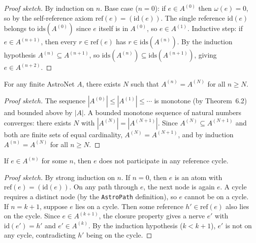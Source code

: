 \begin{proof}[Proof sketch]
By induction on $n$.  Base case ($n = 0$): if $e \in A^{(0)}$ then $\omega(e) = 0$, so by the self-reference axiom $\mathrm{ref}(e) = (\mathrm{id}(e))$.  The single reference $\mathrm{id}(e)$ belongs to $\mathrm{ids}(A^{(0)})$ since $e$ itself is in $A^{(0)}$, so $e \in A^{(1)}$.  Inductive step: if $e \in A^{(n+1)}$, then every $r \in \mathrm{ref}(e)$ has $r \in \mathrm{ids}(A^{(n)})$.  By the induction hypothesis $A^{(n)} \subseteq A^{(n+1)}$, so $\mathrm{ids}(A^{(n)}) \subseteq \mathrm{ids}(A^{(n+1)})$, giving $e \in A^{(n+2)}$.
\end{proof}

\begin{theorem}[Stabilization]\label{prop:stage-stabilize}
For any finite AstroNet $A$, there exists $N$ such that $A^{(n)} = A^{(N)}$ for all $n \geq N$.
\end{theorem}

\begin{proof}[Proof sketch]
The sequence $|A^{(0)}| \leq |A^{(1)}| \leq \cdots$ is monotone (by Theorem~6.2) and bounded above by $|A|$.  A bounded monotone sequence of natural numbers converges: there exists $N$ with $|A^{(N)}| = |A^{(N+1)}|$.  Since $A^{(N)} \subseteq A^{(N+1)}$ and both are finite sets of equal cardinality, $A^{(N)} = A^{(N+1)}$, and by induction $A^{(n)} = A^{(N)}$ for all $n \geq N$.
\end{proof}

\begin{theorem}
If $e \in A^{(n)}$ for some $n$, then $e$ does not participate in any reference cycle.
\end{theorem}

\begin{proof}[Proof sketch]
By strong induction on $n$.  If $n = 0$, then $e$ is an atom with $\mathrm{ref}(e) = (\mathrm{id}(e))$.  On any path through $e$, the next node is again $e$.  A cycle requires a distinct node (by the \texttt{AstroPath} definition), so $e$ cannot be on a cycle.  If $n = k+1$, suppose $e$ lies on a cycle.  Then some reference $h' \in \mathrm{ref}(e)$ also lies on the cycle.  Since $e \in A^{(k+1)}$, the closure property gives a nerve $e'$ with $\mathrm{id}(e') = h'$ and $e' \in A^{(k)}$.  By the induction hypothesis ($k < k+1$), $e'$ is not on any cycle, contradicting $h'$ being on the cycle.
\end{proof}


